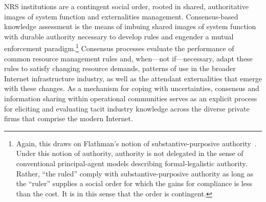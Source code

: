\documentclass[12pt,journal,compsoc,letterpaper,onecolumn,twoside]{IEEEtran}
\begin{document}
NRS institutions are a contingent social
order, rooted in shared, authoritative images of system function and
externalities management.
%
Consensus-based knowledge assessment is the means of imbuing shared
images of system function with durable authority necessary to develop
rules and engender a mutual enforcement paradigm.\footnote{Again, this draws
  on Flathman's notion of substantive-purposive  authority~\citeyear{flathman1980authority}.  Under this
notion of authority, authority is not delegated in the sense of
conventional principal-agent models describing formal-legalistic
authority.  Rather, ``the ruled'' comply with substantive-purposive
authority as long as the ``ruler'' supplies a social order for which
the gains for compliance is less than the cost.  It is in this sense
that the order is contingent.}
%
Consensus processes evaluate
the performance of common resource management rules and, when---not if---necessary, adapt these rules to satisfy changing resource demands,
patterns of use in the broader Internet infrastructure industry, as
well as the attendant externalities that emerge with these changes.  
%
As a mechanism for coping with uncertainties, consensus and
information sharing within operational communities serves as an
explicit process for eliciting and evaluating tacit industry knowledge
across the diverse private firms that comprise the modern Internet.
\end{document}
